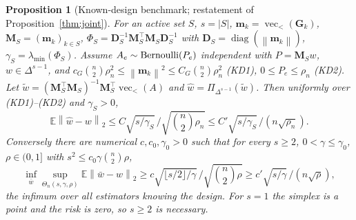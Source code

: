 \documentclass[12pt]{article}
\newtheorem{proposition}{Proposition}
\newcommand{\E}{\mathbb{E}}
\newcommand{\1}{\mathbf{1}}
\newcommand{\norm}[1]{\left\lVert#1\right\rVert}
\DeclareMathOperator{\diag}{diag}
\begin{document}
\begin{proposition}[Known-design benchmark; restatement of
Proposition~\ref{thm:joint}]
\label{prop:known-design-cor}
For an active set $S$, $s=|S|$, $\mathbf m_k=\operatorname{vec}_<(\mathbf G_k)$, $\mathbf
M_S=(\mathbf m_k)_{k\in S}$, $\Phi_S=\mathbf D_S^{-1}\mathbf M_S^\top\mathbf M_S\mathbf D_S^{-1}$
with $\mathbf D_S=\diag(\norm{\mathbf m_k})$, $\gamma_S=\lambda_{\min}(\Phi_S)$. Assume
$A_e\sim{\rm Bernoulli}(P_e)$ independent with $P=\mathbf M_Sw$, $w\in\Delta^{s-1}$, and
$c_G\binom{n}{2}\rho_n^2\le\norm{\mathbf m_k}^2\le C_G\binom{n}{2}\rho_n^2$ (KD1), $0\le P_e\le\rho_n$ (KD2). Let
$\widetilde w=(\mathbf M_S^\top\mathbf M_S)^{-1}\mathbf M_S^\top\operatorname{vec}_<(A)$ and
$\widehat w=\Pi_{\Delta^{s-1}}(\widetilde w)$. Then uniformly over (KD1)--(KD2) and $\gamma_S>0$,
\[
        \E\norm{\widehat w-w}_2\le C\sqrt{s/\gamma_S}\,/\sqrt{\binom{n}{2}\rho_n}\le C'\sqrt{s/\gamma_S}\,/(n\sqrt{\rho_n}).
\]
Conversely there are numerical $c,c_0,\gamma_0>0$ such that for every $s\ge2$, $0<\gamma\le\gamma_0$,
$\rho\in(0,1]$ with $s^2\le c_0\gamma \binom{n}{2}\rho$,
\[
        \inf_{\bar w}\sup_{\Theta_n(s,\gamma,\rho)}\E\norm{\bar w-w}_2\ge
        c\sqrt{\lfloor s/2\rfloor/\gamma}\,/\sqrt{\binom{n}{2}\rho}\ge c'\sqrt{s/\gamma}\,/(n\sqrt{\rho}),
\]
the infimum over all estimators knowing the design. For $s=1$ the simplex is a point and the risk
is zero, so $s\ge2$ is necessary.
\end{proposition}
\end{document}
